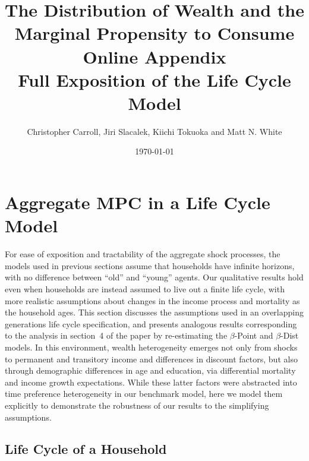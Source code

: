 \documentclass[11pt,a4paper,pdftex]{article}\usepackage[pdftex]{graphicx}\usepackage{epstopdf} \usepackage[pdftex]{hyperref}
\newcommand{\Discount}{\ensuremath{\beta}}
\begin{document}
%


\title{\textbf{
{\normalsize The Distribution of Wealth and the Marginal Propensity to Consume}\\[5mm]
Online Appendix\\
Full Exposition of the Life Cycle Model
}%
}%

\author[]{Christopher Carroll, Jiri Slacalek, Kiichi Tokuoka and Matt N. White}

\date{\today}

\maketitle
\vspace*{-6mm}

\thispagestyle{empty}
\newpage


\section{Aggregate MPC in a Life Cycle Model}\label{sec:Robustness}

For ease of exposition and tractability of the aggregate shock processes, the models used in previous sections assume that households have infinite horizons, with no difference between ``old'' and ``young'' agents.  Our qualitative results hold even when households are instead assumed to live out a finite life cycle, with more realistic assumptions about changes in the income process and mortality as the household ages.  This section discusses the assumptions used in an overlapping generations life cycle specification, and presents analogous results corresponding to the analysis in section~4 of the paper by re-estimating the \Discount-Point and \Discount-Dist models.  In this environment, wealth heterogeneity emerges not only from shocks to permanent and transitory income and differences in discount factors, but also through demographic differences in age and education, via differential mortality and income growth expectations.  While these latter factors were abstracted into time preference heterogeneity in our benchmark model, here we model them explicitly to demonstrate the robustness of our results to the simplifying assumptions.

\subsection{Life Cycle of a Household}\label{sec:LifeCycle}
\end{document}
